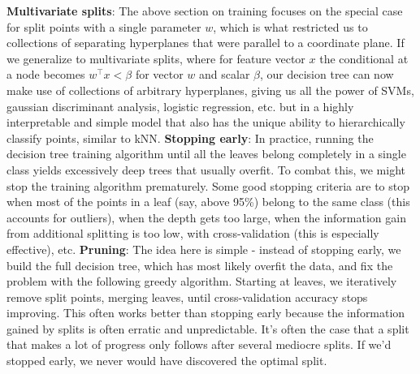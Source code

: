 \documentclass{article}
\begin{document}
\textbf{Multivariate splits}: The above section on training focuses on the special case for split points with a single parameter $ w $, which is what restricted us to collections of separating hyperplanes that were parallel to a coordinate plane. If we generalize to multivariate splits, where for feature vector $ x $ the conditional at a node becomes $ w^\intercal x < \beta $ for vector $ w $ and scalar $ \beta $, our decision tree can now make use of collections of arbitrary hyperplanes, giving us all the power of SVMs, gaussian discriminant analysis, logistic regression, etc. but in a highly interpretable and simple model that also has the unique ability to hierarchically classify points, similar to kNN.
\newline \newline
\textbf{Stopping early}: In practice, running the decision tree training algorithm until all the leaves belong completely in a single class yields excessively deep trees that usually overfit. To combat this, we might stop the training algorithm prematurely. Some good stopping criteria are to stop when most of the points in a leaf (say, above 95\%) belong to the same class (this accounts for outliers), when the depth gets too large, when the information gain from additional splitting is too low, with cross-validation (this is especially effective), etc.
\newline \newline
\textbf{Pruning}: The idea here is simple - instead of stopping early, we build the full decision tree, which has most likely overfit the data, and fix the problem with the following greedy algorithm. Starting at leaves, we iteratively remove split points, merging leaves, until cross-validation accuracy stops improving. This often works better than stopping early because the information gained by splits is often erratic and unpredictable. It's often the case that a split that makes a lot of progress only follows after several mediocre splits. If we'd stopped early, we never would have discovered the optimal split.
\end{document}
